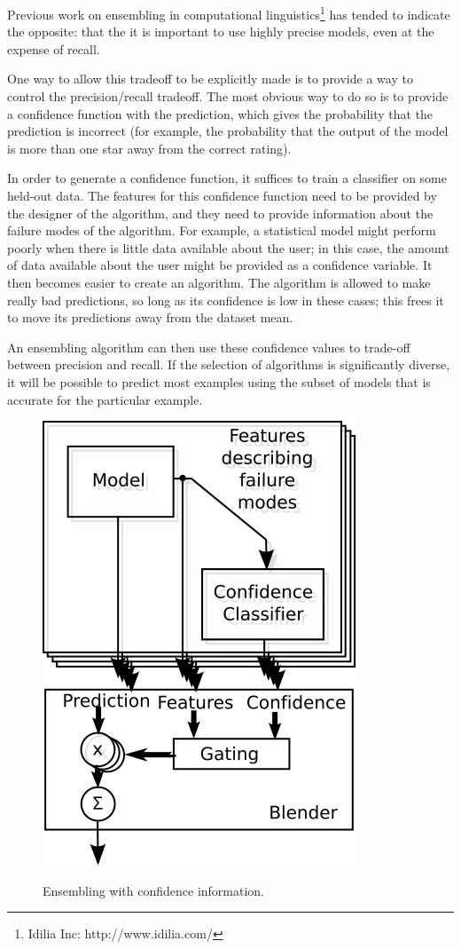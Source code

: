 \documentclass{article}
\begin{document}
Previous work on ensembling in computational linguistics\footnote{Idilia Inc: http://www.idilia.com/} has tended to indicate the opposite: that the it is important to use highly precise models, even at the expense of recall.

One way to allow this tradeoff to be explicitly made is to provide a way to control the precision/recall tradeoff.  The most obvious way to do so is to provide a confidence function with the prediction, which gives the probability that the prediction is incorrect (for example, the probability that the output of the model is more than one star away from the correct rating).

In order to generate a confidence function, it suffices to train a classifier on some held-out data.  The features for this confidence function need to be provided by the designer of the algorithm, and they need to provide information about the failure modes of the algorithm.  For example, a statistical model might perform poorly when there is little data available about the user; in this case, the amount of data available about the user might be provided as a confidence variable.  It then becomes easier to create an algorithm.  The algorithm is allowed to make really bad predictions, so long as its confidence is low in these cases; this frees it to move its predictions away from the dataset mean.

An ensembling algorithm can then use these confidence values to trade-off between precision and recall.  If the selection of algorithms is significantly diverse, it will be possible to predict most examples using the subset of models that is accurate for the particular example.

\begin{figure}[t]
\vskip 0.2in
\caption{Ensembling with confidence information.}
\begin{center}
\centerline{\includegraphics{betterblender}}
\label{fig:ensembling-confidence}
\end{center}
\vskip -0.2in
\end{figure} 
\end{document}
